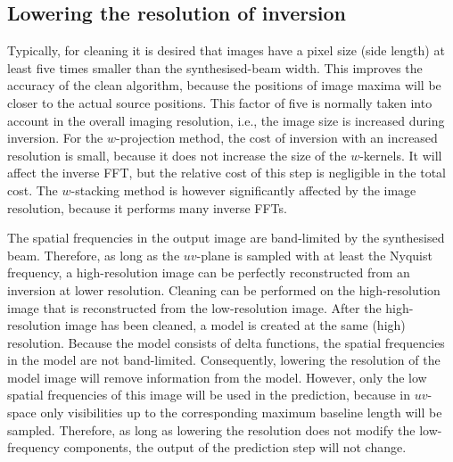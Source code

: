 \documentclass[useAMS,usenatbib]{mn2e}
\begin{document}
\subsection{Lowering the resolution of inversion} \label{sec:decreasing-inversion-resolution}
Typically, for cleaning it is desired that images have a pixel size (side length) at least five times smaller than the synthesised-beam width. This improves the accuracy of the clean algorithm, because the positions of image maxima will be closer to the actual source positions. This factor of five is normally taken into account in the overall imaging resolution, i.e., the image size is increased during inversion. For the $w$-projection method, the cost of inversion with an increased resolution is small, because it does not increase the size of the $w$-kernels. It will affect the inverse FFT, but the relative cost of this step is negligible in the total cost. The $w$-stacking method is however significantly affected by the image resolution, because it performs many inverse FFTs.

The spatial frequencies in the output image are band-limited by the synthesised beam. Therefore, as long as the $uv$-plane is sampled with at least the Nyquist frequency, a high-resolution image can be perfectly reconstructed from an inversion at lower resolution. Cleaning can be performed on the high-resolution image that is reconstructed from the low-resolution image. After the high-resolution image has been cleaned, a model is created at the same (high) resolution. Because the model consists of delta functions, the spatial frequencies in the model are not band-limited. Consequently, lowering the resolution of the model image will remove information from the model. However, only the low spatial frequencies of this image will be used in the prediction, because in $uv$-space only visibilities up to the corresponding maximum baseline length will be sampled. Therefore, as long as lowering the resolution does not modify the low-frequency components, the output of the prediction step will not change.
\end{document}
